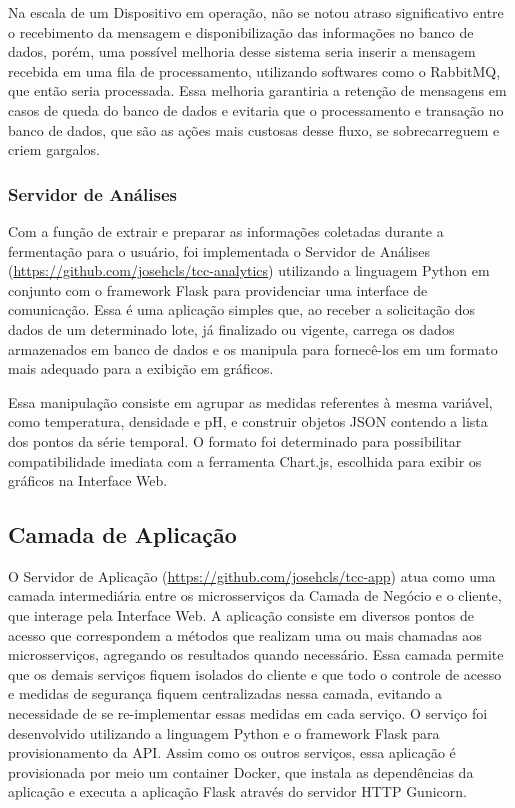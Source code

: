 Na escala de um Dispositivo em operação, não se notou atraso significativo entre o recebimento da mensagem e disponibilização das informações no banco de dados, porém, uma possível melhoria desse sistema seria inserir a mensagem recebida em uma fila de processamento, utilizando softwares como o RabbitMQ, que então seria processada. Essa melhoria garantiria a retenção de mensagens em casos de queda do banco de dados e evitaria que o processamento e transação no banco de dados, que são as ações mais custosas desse fluxo, se sobrecarreguem e criem gargalos.


\subsubsection{Servidor de Análises}


Com a função de extrair e preparar as informações coletadas durante a fermentação para o usuário, foi implementada o Servidor de Análises (\url{https://github.com/josehcls/tcc-analytics}) utilizando a linguagem Python em conjunto com o framework Flask para providenciar uma interface de comunicação. Essa é uma aplicação simples que, ao receber a solicitação dos dados de um determinado lote, já finalizado ou vigente, carrega os dados armazenados em banco de dados e os manipula para fornecê-los em um formato mais adequado para a exibição em gráficos. 


Essa manipulação consiste em agrupar as medidas referentes à mesma variável, como temperatura, densidade e pH, e construir objetos JSON contendo a lista dos pontos da série temporal. O formato foi determinado para possibilitar compatibilidade imediata com a ferramenta Chart.js, escolhida para exibir os gráficos na Interface Web.


\subsection{Camada de Aplicação} 


O Servidor de Aplicação (\url{https://github.com/josehcls/tcc-app}) atua como uma camada intermediária entre os microsserviços da Camada de Negócio e o cliente, que interage pela Interface Web. A aplicação consiste em diversos pontos de acesso que correspondem a métodos que realizam uma ou mais chamadas aos microsserviços, agregando os resultados quando necessário. Essa camada permite que os demais serviços fiquem isolados do cliente e que todo o controle de acesso e medidas de segurança fiquem centralizadas nessa camada, evitando a necessidade de se re-implementar essas medidas em cada serviço.
O serviço foi desenvolvido utilizando a linguagem Python e o framework Flask para provisionamento da API. Assim como os outros serviços, essa aplicação é provisionada por meio um container Docker, que instala as dependências da aplicação e executa a aplicação Flask através do servidor HTTP Gunicorn.


